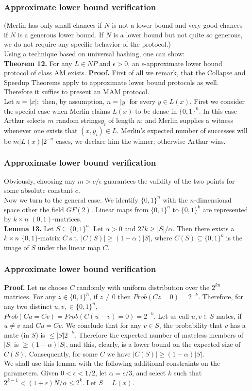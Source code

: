 \documentclass{beamer}
\begin{document}
\begin{frame}
\frametitle{Approximate lower bound verification}
(Merlin has only small chances if $N$ is not a lower bound and very good chances if $N$ is a generous lower bound. If $N$ is a lower bound but not quite so generous, we do not require any specific behavior of the protocol.)\\
Using a technique based on universal hashing, one can show:\\
\textbf{Theorem 12.} For any $L \in NP$ and $\epsilon > 0$, an $\epsilon$-approximate lower bound protocol of class AM exists.
\textbf{Proof.} First of all we remark, that the Collapse and Speedup Theorems apply to approximate lower bound protocols as well. Therefore it suffies to present an MAM protocol.\\
Let $n = |x|;$ then, by assumption, $n = |y|$ for every $y \in L(x)$. First we consider the special case when Merlin claims $L(x)$ to be dense in $\{0, 1\}^n$. In this case Arthur selects $m$ random strings$y_i$ of length $n$; and Merlin supplies a witness whenever one exists that $(x, y_i) \in L$. Merlin's expected number of successes will be $m|L(x)|2^{-n}$ cases, we declare him the winner; otherwise Arthur wins.
\end{frame}

\begin{frame}
\frametitle{Approximate lower bound verification}
Obviously, choosing any $m > c/\epsilon$ guarantees the validity of the two points for some absolute constant $c$.\\
Now we turn to the general case. We identify $\{0, 1\}^n$ with the $n$-dimensional space other the field $GF(2)$. Linear maps from $\{0, 1\}^n$ to $\{0, 1\}^k$ are represented by $k \times n$ $(0, 1)$-matrices.\\
\textbf{Lemma 13.} Let $S \subseteq \{0,1\}^n$. Let $\alpha > 0$ and $2?k \geq |S|/\alpha$. Then there exists a $k \times n$ $\{0, 1\}$-matrix $C$ s.t. $|C(S)|\geq (1- \alpha)|S|$, where $C(S) \subseteq \{0, 1\}^k$ is the image of $S$ under the linear map $C$.
\end{frame}

\begin{frame}
\frametitle{Approximate lower bound verification}
\textbf{Proof.} Let us choose $C$ randomly with uniform distribution over the $2^{kn}$ matrices. For any $z \in \{0, 1\}^n$, if $z \neq 0$ then $Prob(Cz = 0) = 2^{-k}$. Therefore, for any two distinct $u, v, \in \{0 ,1\}^n$, $Prob(Cu = Cv) = Prob(C(u-v)=0)=2^{-k}$. Let us call $u, v \in S$ mates, if $u \neq v$ and $Cu = Cv$. We conclude that for any $v \in S$, the probability that $v$ has a mate (in $S$) is $\leq |S|2^{-k}$. Therefore the expected number of mateless members of $|S|$ is $\geq (1 - \alpha)|S|$, and this, clearly, is a lower bound on the expected size of $C(S)$. Consequently, for some $C$ we have $|C(S)| \geq (1 - \alpha)|S|$.\\
We shall use this lemma with the following additional constraints on the parameters. Given $0 < \epsilon < 1/2$, let $\alpha = \epsilon/3$, and select $k$ such that $2^{k-1} < (1+\epsilon)N/\alpha \leq 2^k$. Let $S = L(x)$.
\end{frame}
\end{document}
